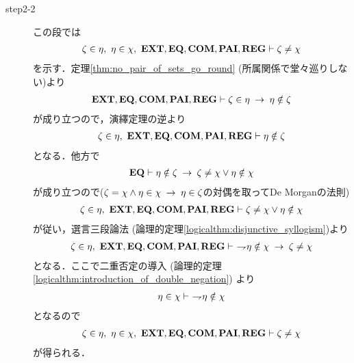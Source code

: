 \begin{sketch}
\begin{description}
\begin{description}
					\item[step2-2] この段では
						\begin{align}
							\zeta \in \eta,\ \eta \in \chi,\ 
							\EXTAX,\EQAX,\COMAX,\PAIAX,\REGAX 
							\vdash \zeta \neq \chi
						\end{align}
						を示す．定理\ref{thm:no_pair_of_sets_go_round}
						(所属関係で堂々巡りしない)より
						\begin{align}
							\mbox{{\bf EXT}},\mbox{{\bf EQ}},\mbox{\bf COM},\mbox{{\bf PAI}},\mbox{{\bf REG}} \vdash 
							\zeta \in \eta \hspace{0.25em}\rightarrow\hspace{0.25em} \eta \notin \zeta
						\end{align}
						が成り立つので，演繹定理の逆より
						\begin{align}
							\zeta \in \eta,\ \EXTAX,\EQAX,\COMAX,\PAIAX,\REGAX 
							\vdash \eta \notin \zeta
						\end{align}
						となる．他方で
						\begin{align}
							\mbox{{\bf EQ}} \vdash \eta \notin \zeta 
							\hspace{0.25em}\rightarrow\hspace{0.25em} \zeta \neq \chi \vee \eta \notin \chi
						\end{align}
						が成り立つので($\zeta = \chi \wedge \eta \in \chi 
						\hspace{0.25em}\rightarrow\hspace{0.25em} \eta \in \zeta$の対偶を取ってDe Morganの法則)
						\begin{align}
							\zeta \in \eta,\ \EXTAX,\EQAX,\COMAX,\PAIAX,\REGAX 
							\vdash \zeta \neq \chi \vee \eta \notin \chi
						\end{align}
						が従い，選言三段論法
						(論理的定理\ref{logicalthm:disjunctive_syllogism})より
						\begin{align}
							\zeta \in \eta,\ \EXTAX,\EQAX,\COMAX,\PAIAX,\REGAX 
							\vdash\ \negation \eta \notin \chi
							\rarrow \zeta \neq \chi
						\end{align}
						となる．ここで二重否定の導入
						(論理的定理\ref{logicalthm:introduction_of_double_negation})
						より
						\begin{align}
							\eta \in \chi \vdash\ \rightharpoondown\hspace{-0.25em} \eta \notin \chi
						\end{align}
						となるので
						\begin{align}
							\zeta \in \eta,\ \eta \in \chi,\ 
							\EXTAX,\EQAX,\COMAX,\PAIAX,\REGAX 
							\vdash \zeta \neq \chi
							\label{fom:thm_transitive_totally_ordered_class_6}
						\end{align}
						が得られる．
						

\end{description}
\end{description}
\end{sketch}
